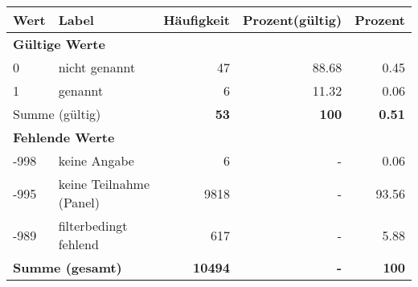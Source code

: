      \begin{longtable}{lXrrr}
     \toprule
     \textbf{Wert} & \textbf{Label} & \textbf{Häufigkeit} & \textbf{Prozent(gültig)} & \textbf{Prozent} \\
     \endhead
     \midrule
     \multicolumn{5}{l}{\textbf{Gültige Werte}}\\

     0 &
     \multicolumn{1}{X}{ nicht genannt   } &


       \num{47} &
       \num[round-mode=places,round-precision=2]{88.68} &
         \num[round-mode=places,round-precision=2]{0.45} \\

     1 &
     \multicolumn{1}{X}{ genannt   } &


       \num{6} &
       \num[round-mode=places,round-precision=2]{11.32} &
         \num[round-mode=places,round-precision=2]{0.06} \\
     \midrule
     \multicolumn{2}{l}{Summe (gültig)} &
       \textbf{\num{53}} &
     \textbf{\num{100}} &
       \textbf{\num[round-mode=places,round-precision=2]{0.51}} \\
     \multicolumn{5}{l}{\textbf{Fehlende Werte}}\\
       -998 &
       keine Angabe &
         \num{6} &
        - &
         \num[round-mode=places,round-precision=2]{0.06} \\
       -995 &
       keine Teilnahme (Panel) &
         \num{9818} &
        - &
         \num[round-mode=places,round-precision=2]{93.56} \\
       -989 &
       filterbedingt fehlend &
         \num{617} &
        - &
         \num[round-mode=places,round-precision=2]{5.88} \\
     \midrule
     \multicolumn{2}{l}{\textbf{Summe (gesamt)}} &
          \textbf{\num{10494}} &
        \textbf{-} &
        \textbf{\num{100}} \\
     \bottomrule
     \end{longtable}
     
